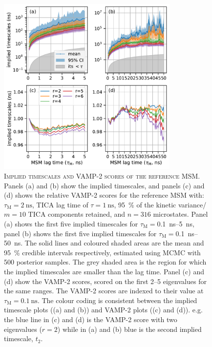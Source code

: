 \begin{figure}
    \centering

    \includegraphics[width=0.8\textwidth]{chapters/aadh/figures/implied_timescales_D.pdf}
    \caption[Implied timescales and VAMP-2 scores of the reference MSM]{\textsc{Implied timescales and VAMP-2 scores of the reference MSM}. Panels (a) and (b) show the implied timescales, and panels (c) and (d) shows the relative VAMP-2 scores for the reference MSM with: $\tau_{\textrm{M}}=\SI{2}{\nano\second}$, TICA lag time of $\tau=\SI{1}{\nano\second}$, \SI{95}{\percent} of the kinetic variance/$m=10$ TICA components retained, and $n=316$ microstates. Panel (a) shows the first five implied timescales for $\tau_{\mathrm{M}}=$\SIrange[range-phrase=\text{--}]{0.1}{5}{\nano\second}, panel (b) shows the first five implied timescales for $\tau_{\mathrm{M}} = $\SIrange[range-phrase=\text{--}]{0.1}{50}{\nano\second}. The solid lines and coloured shaded areas are the mean and \SI{95}{\percent} credible intervals respectively, estimated using MCMC with \num{500} posterior samples. The grey shaded area is the region for which the implied timescales are smaller than the lag time. Panel (c) and (d) show the VAMP-2 scores, scored on the first \numrange{2}{5} eigenvalues for the same ranges. The VAMP-2 scores are indexed to their value at $\tau_{\mathrm{M}}=\SI{0.1}{\nano\second}$. The colour coding is consistent between the implied timescale plots ((a) and (b)) and VAMP-2 plots ((c) and (d)). e.g. the blue line in (c) and (d) is the VAMP-2 score with two eigenvalues ($r=2$) while in (a) and (b) blue is the second implied timescale, $t_{2}$. }
    \label{fig:its_d}
\end{figure}

